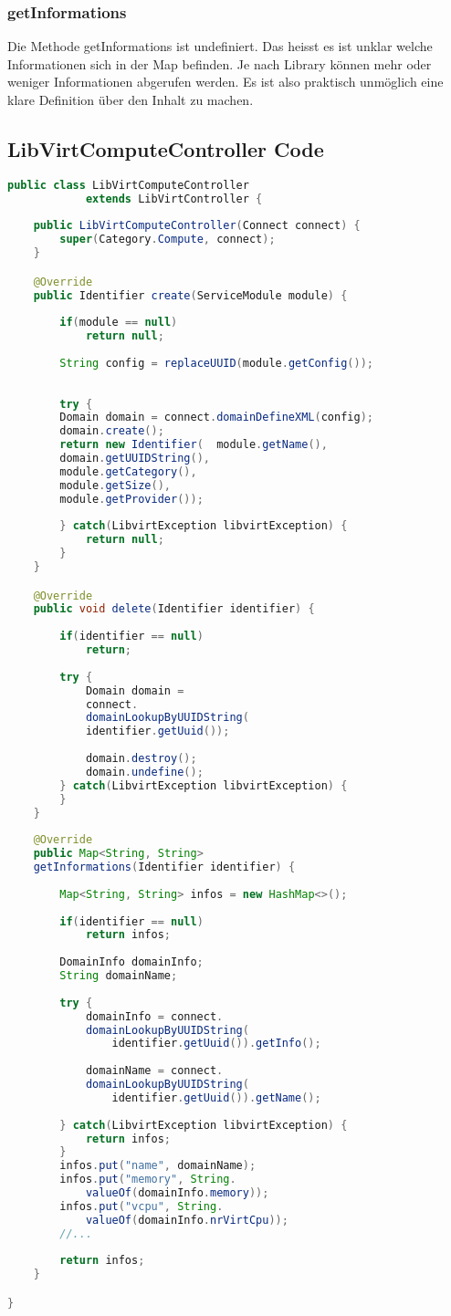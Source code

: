 \subsubsection{getInformations}
Die Methode getInformations ist undefiniert. Das heisst es ist unklar welche Informationen sich in der Map befinden. Je nach Library können mehr oder weniger Informationen abgerufen werden. 
Es ist also praktisch unmöglich eine klare Definition über den Inhalt zu machen.

\subsection{LibVirtComputeController Code}

\begin{lstlisting}[language=Java,frame=single] 
public class LibVirtComputeController 
			extends LibVirtController {
	
	public LibVirtComputeController(Connect connect) {
		super(Category.Compute, connect);
	}

	@Override
	public Identifier create(ServiceModule module) {
		
		if(module == null)
			return null;
		
		String config = replaceUUID(module.getConfig());
		
	
		try {
		Domain domain = connect.domainDefineXML(config);
		domain.create();
		return new Identifier(	module.getName(),
		domain.getUUIDString(), 
		module.getCategory(), 
		module.getSize(), 
		module.getProvider());
									
		} catch(LibvirtException libvirtException) {
			return null;
		}
	}

	@Override
	public void delete(Identifier identifier) {
		
		if(identifier == null)
			return;
		
		try {
			Domain domain = 
			connect.
			domainLookupByUUIDString(
			identifier.getUuid());
			
			domain.destroy();
			domain.undefine();
		} catch(LibvirtException libvirtException) {
		}
	}
	
	@Override
	public Map<String, String> 
	getInformations(Identifier identifier) {
		
		Map<String, String> infos = new HashMap<>();
		
		if(identifier == null)
			return infos;
		
		DomainInfo domainInfo;
		String domainName;
		
		try {
			domainInfo = connect.
			domainLookupByUUIDString(
				identifier.getUuid()).getInfo();
			
			domainName = connect.
			domainLookupByUUIDString(
				identifier.getUuid()).getName();
			
		} catch(LibvirtException libvirtException) {
			return infos;
		}
		infos.put("name", domainName);
		infos.put("memory", String.
			valueOf(domainInfo.memory));
		infos.put("vcpu", String.
			valueOf(domainInfo.nrVirtCpu));
		//...
		
		return infos;
	}

}
\end{lstlisting}
